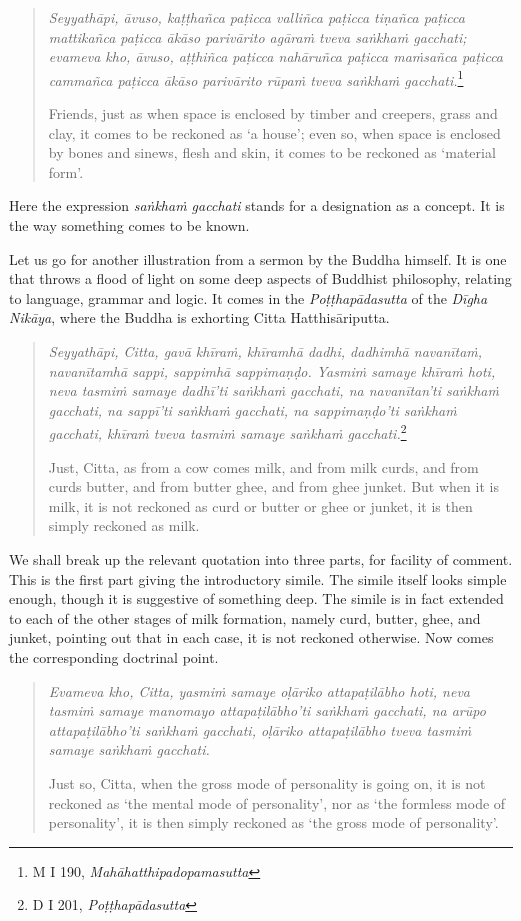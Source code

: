 \begin{quote}
\emph{Seyyathāpi, āvuso, kaṭṭhañca paṭicca valliñca paṭicca tiṇañca paṭicca mattikañca paṭicca ākāso parivārito agāraṁ tveva saṅkhaṁ gacchati; evameva kho, āvuso, aṭṭhiñca paṭicca nahāruñca paṭicca maṁsañca paṭicca cammañca paṭicca ākāso parivārito rūpaṁ tveva saṅkhaṁ gacchati.}\footnote{M I 190, \emph{Mahāhatthipadopamasutta}}

Friends, just as when space is enclosed by timber and creepers, grass and clay, it comes to be reckoned as `a house'; even so, when space is enclosed by bones and sinews, flesh and skin, it comes to be reckoned as `material form'.
\end{quote}

Here the expression \emph{saṅkhaṁ gacchati} stands for a designation as a concept. It is the way something comes to be known.

Let us go for another illustration from a sermon by the Buddha himself. It is one that throws a flood of light on some deep aspects of Buddhist philosophy, relating to language, grammar and logic. It comes in the \emph{Poṭṭhapādasutta} of the \emph{Dīgha Nikāya}, where the Buddha is exhorting Citta Hatthisāriputta.

\begin{quote}
\emph{Seyyathāpi, Citta, gavā khīraṁ, khīramhā dadhi, dadhimhā navanītaṁ, navanītamhā sappi, sappimhā sappimaṇḍo. Yasmiṁ samaye khīraṁ hoti, neva tasmiṁ samaye dadhī'ti saṅkhaṁ gacchati, na navanītan'ti saṅkhaṁ gacchati, na sappī'ti saṅkhaṁ gacchati, na sappimaṇḍo'ti saṅkhaṁ gacchati, khīraṁ tveva tasmiṁ samaye saṅkhaṁ gacchati.}\footnote{D I 201, \emph{Poṭṭhapādasutta}}

Just, Citta, as from a cow comes milk, and from milk curds, and from curds butter, and from butter ghee, and from ghee junket. But when it is milk, it is not reckoned as curd or butter or ghee or junket, it is then simply reckoned as milk.
\end{quote}

We shall break up the relevant quotation into three parts, for facility of comment. This is the first part giving the introductory simile. The simile itself looks simple enough, though it is suggestive of something deep. The simile is in fact extended to each of the other stages of milk formation, namely curd, butter, ghee, and junket, pointing out that in each case, it is not reckoned otherwise. Now comes the corresponding doctrinal point.

\begin{quote}
\emph{Evameva kho, Citta, yasmiṁ samaye oḷāriko attapaṭilābho hoti, neva tasmiṁ samaye manomayo attapaṭilābho'ti saṅkhaṁ gacchati, na arūpo attapaṭilābho'ti saṅkhaṁ gacchati, oḷāriko attapaṭilābho tveva tasmiṁ samaye saṅkhaṁ gacchati.}

Just so, Citta, when the gross mode of personality is going on, it is not reckoned as `the mental mode of personality', nor as `the formless mode of personality', it is then simply reckoned as `the gross mode of personality'.
\end{quote}


